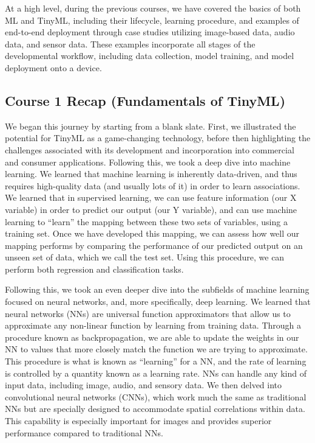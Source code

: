 At a high level, during the previous courses, we have covered the basics of both ML and TinyML, including their lifecycle, learning procedure, and examples of end-to-end deployment through case studies utilizing image-based data, audio data, and sensor data. These examples incorporate all stages of the developmental workflow, including data collection, model training, and model deployment onto a device.

\subsection{Course 1 Recap (Fundamentals of TinyML)}


We began this journey by starting from a blank slate. First, we illustrated the potential for TinyML as a game-changing technology, before then highlighting the challenges associated with its development and incorporation into commercial and consumer applications. Following this, we took a deep dive into machine learning. We learned that machine learning is inherently data-driven, and thus requires high-quality data (and usually lots of it) in order to learn associations. We learned that in supervised learning, we can use feature information (our X variable) in order to predict our output (our Y variable), and can use machine learning to “learn” the mapping between these two sets of variables, using a training set. Once we have developed this mapping, we can assess how well our mapping performs by comparing the performance of our predicted output on an unseen set of data, which we call the test set. Using this procedure, we can perform both regression and classification tasks.

Following this, we took an even deeper dive into the subfields of machine learning focused on neural networks, and, more specifically, deep learning. We learned that neural networks (NNs) are universal function approximators that allow us to approximate any non-linear function by learning from training data. Through a procedure known as backpropagation, we are able to update the weights in our NN to values that more closely match the function we are trying to approximate. This procedure is what is known as “learning” for a NN, and the rate of learning is controlled by a quantity known as a learning rate. NNs can handle any kind of input data, including image, audio, and sensory data. We then delved into convolutional neural networks (CNNs), which work much the same as traditional NNs but are specially designed to accommodate spatial correlations within data. This capability is especially important for images and provides superior performance compared to traditional NNs.

